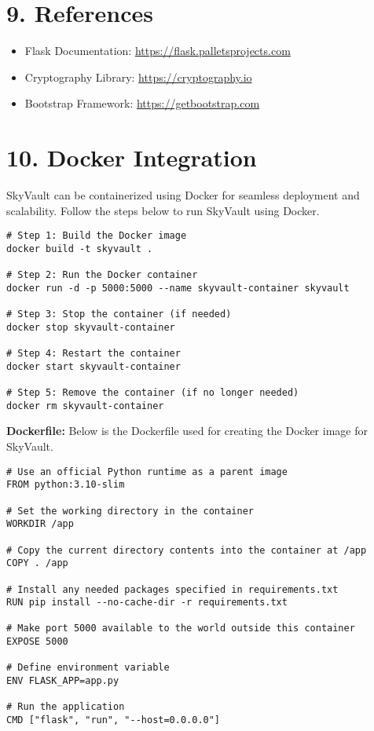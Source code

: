 \documentclass[12pt,a4paper]{article}
\begin{document}
\section*{9. References}
\begin{itemize}
    \item Flask Documentation: \url{https://flask.palletsprojects.com}
    \item Cryptography Library: \url{https://cryptography.io}
    \item Bootstrap Framework: \url{https://getbootstrap.com}
\end{itemize}

\section*{10. Docker Integration}
SkyVault can be containerized using Docker for seamless deployment and scalability. Follow the steps below to run SkyVault using Docker.

\begin{tcolorbox}[colback=gray!5!white, colframe=gray!75!black, sharp corners, boxrule=0.5mm]
\begin{Verbatim}
# Step 1: Build the Docker image
docker build -t skyvault .

# Step 2: Run the Docker container
docker run -d -p 5000:5000 --name skyvault-container skyvault

# Step 3: Stop the container (if needed)
docker stop skyvault-container

# Step 4: Restart the container
docker start skyvault-container

# Step 5: Remove the container (if no longer needed)
docker rm skyvault-container
\end{Verbatim}
\end{tcolorbox}

\textbf{Dockerfile:}
Below is the Dockerfile used for creating the Docker image for SkyVault.

\begin{tcolorbox}[colback=blue!5!white, colframe=blue!75!black, sharp corners, boxrule=0.5mm]
\begin{Verbatim}
# Use an official Python runtime as a parent image
FROM python:3.10-slim

# Set the working directory in the container
WORKDIR /app

# Copy the current directory contents into the container at /app
COPY . /app

# Install any needed packages specified in requirements.txt
RUN pip install --no-cache-dir -r requirements.txt

# Make port 5000 available to the world outside this container
EXPOSE 5000

# Define environment variable
ENV FLASK_APP=app.py

# Run the application
CMD ["flask", "run", "--host=0.0.0.0"]
\end{Verbatim}
\end{tcolorbox}
\end{document}
